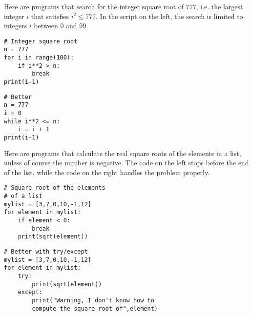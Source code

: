 \documentclass[11pt,class=report,crop=false]{standalone}
\begin{document}
\begin{cours}
\begin{exemple}

Here are programs that search for the integer square root of $777$, i.e. the largest integer $i$ that satisfies $i^2 \le 777$. In the script on the left, the search is limited to integers $i$ between $0$ and $99$.

\begin{minipage}{0.4\textwidth}
\begin{lstlisting}
# Integer square root
n = 777
for i in range(100):
    if i**2 > n:
        break
print(i-1)
\end{lstlisting}
\end{minipage}\qquad\qquad
\begin{minipage}{0.4\textwidth}
\begin{lstlisting}
# Better
n = 777
i = 0 
while i**2 <= n:
    i = i + 1
print(i-1) 
\end{lstlisting}
\end{minipage}
\end{exemple}

\begin{exemple}

Here are programs that calculate the real square roots of the elements in a list, unless of course the number is negative. The code on the left stops before the end of the list, while the code on the right handles the problem properly. 

\begin{minipage}{0.4\textwidth}
\begin{lstlisting}
# Square root of the elements
# of a list
mylist = [3,7,0,10,-1,12]
for element in mylist:
    if element < 0:
        break
    print(sqrt(element))
\end{lstlisting}
\end{minipage}\qquad
\begin{minipage}{0.4\textwidth}
\begin{lstlisting}
# Better with try/except
mylist = [3,7,0,10,-1,12]
for element in mylist:
    try: 
        print(sqrt(element))
    except:
        print("Warning, I don't know how to 
        compute the square root of",element)
\end{lstlisting}
\end{minipage}
\end{exemple}


\end{cours}
\end{document}
